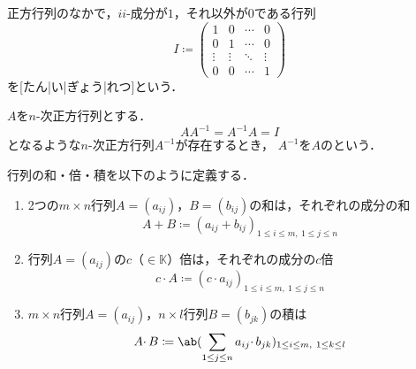 \documentclass[../sotsu.tex]{subfiles}
\begin{document}
\begin{definition}
    正方行列のなかで，$ii$-成分が$1$，それ以外が$0$である行列
    \begin{equation}
        I \coloneq 
        \begin{pmatrix}
            1  &  0  &  \cdots  &  0  \\
            0  &  1  &  \cdots  &  0  \\
            \vdots & \vdots & \ddots & \vdots \\
            0  &  0  &  \cdots  &  1  
        \end{pmatrix}
    \end{equation}
    を[たん|い|ぎょう|れつ]という．
\end{definition}

\begin{definition}
    \label{dfn:inverse-of-matrix}
    $A$を$n$-次正方行列とする．
    \begin{equation}
        A A^{-1} = A^{-1} A = I
    \end{equation}
    となるような$n$-次正方行列$A^{-1}$が存在するとき，
    $A^{-1}$を$A$のという．
\end{definition}


\begin{definition}
    行列の和・倍・積を以下のように定義する．
    \begin{enumerate}
        \item 2つの$m \times n$行列$A = (a_{ij})$，$B = (b_{ij})$の和は，それぞれの成分の和
            \begin{equation}
                A + B \coloneq (a_{ij} + b_{ij})_{1 \leq i \leq m, \  1 \leq j \leq n}
            \end{equation}
        \item 行列$A = (a_{ij})$の$c$（$\in 𝕂$）倍は，それぞれの成分の$c$倍
            \begin{equation}
                c \cdotp A \coloneq (c \cdotp a_{ij})_{1 \leq i \leq m, \  1 \leq j \leq n}
            \end{equation}
        \item $m \times n$行列$A = (a_{ij})$，$n \times l$行列$B = (b_{jk})$の積は
            \begin{equation}
                A \cdotp B \coloneq \ab( \sum_{1 \leq j \leq n} a_{ij} \cdotp b_{jk} )_{1 \leq i \leq m, \  1 \leq k \leq l}
            \end{equation}
    \end{enumerate}
\end{definition}
\end{document}
